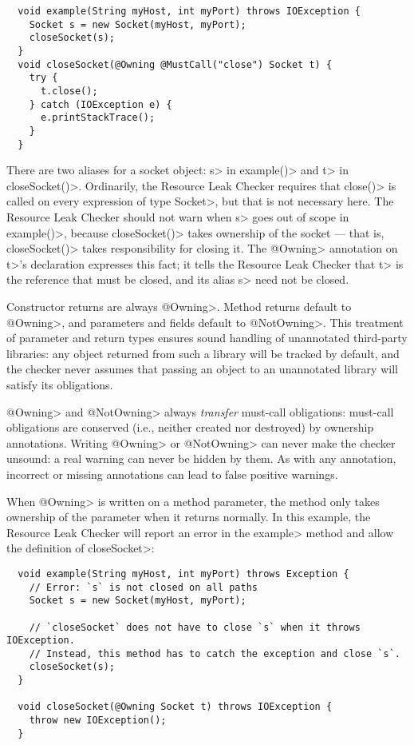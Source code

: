 \begin{verbatim}
  void example(String myHost, int myPort) throws IOException {
    Socket s = new Socket(myHost, myPort);
    closeSocket(s);
  }
  void closeSocket(@Owning @MustCall("close") Socket t) {
    try {
      t.close();
    } catch (IOException e) {
      e.printStackTrace();
    }
  }
\end{verbatim}

There are two aliases for a socket object: \<s> in \<example()> and \<t> in
\<closeSocket()>.  Ordinarily, the Resource Leak Checker requires that
\<close()> is called on every expression of type \<Socket>, but that is not
necessary here.  The Resource Leak Checker should not warn when
\<s> goes out of scope in \<example()>, because \<closeSocket()> takes ownership
of the socket --- that is, \<closeSocket()> takes responsibility for closing
it. The \<@Owning> annotation on \<t>'s declaration expresses this fact; it
tells the Resource Leak Checker that \<t> is the reference that must be
closed, and its alias \<s> need not be closed.

Constructor returns are always \<@Owning>.
Method returns default to \<@Owning>,
and parameters and fields default to \<@NotOwning>. This treatment of parameter and
return types ensures sound handling of unannotated third-party libraries: any
object returned from such a library will be tracked by default, and the checker
never assumes that passing an object to an unannotated library will satisfy its obligations.

\<@Owning> and \<@NotOwning> always \emph{transfer} must-call obligations: must-call
obligations are conserved (i.e., neither created nor destroyed) by ownership annotations.
Writing \<@Owning> or \<@NotOwning> can never make the checker
unsound:  a real warning can never be hidden by them.
As with any annotation, incorrect or missing annotations can lead to false positive warnings.


When \<@Owning> is written on a method parameter, the method only takes ownership of the
parameter when it returns normally.  In this example, the Resource Leak Checker will report
an error in the \<example> method and allow the definition of \<closeSocket>:

\begin{verbatim}
  void example(String myHost, int myPort) throws Exception {
    // Error: `s` is not closed on all paths
    Socket s = new Socket(myHost, myPort);

    // `closeSocket` does not have to close `s` when it throws IOException.
    // Instead, this method has to catch the exception and close `s`.
    closeSocket(s);
  }

  void closeSocket(@Owning Socket t) throws IOException {
    throw new IOException();
  }
\end{verbatim}

